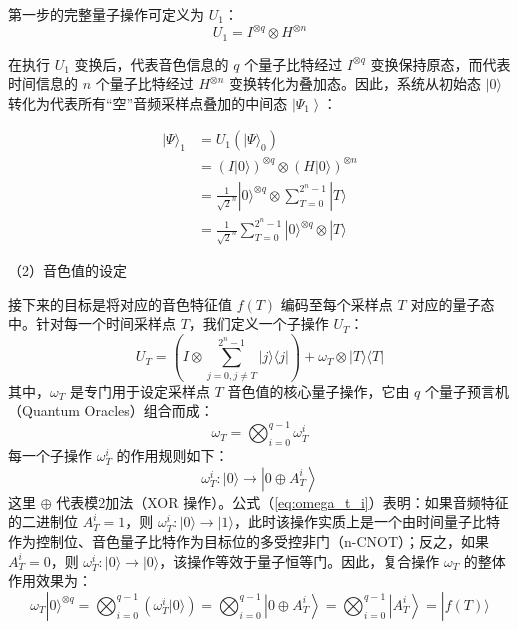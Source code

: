 第一步的完整量子操作可定义为 $U_1$：
\begin{equation}
	U_1=I^{\otimes q} \otimes H^{\otimes n}
	\label{eq:u1_op}
\end{equation}

在执行 $U_1$ 变换后，代表音色信息的 $q$ 个量子比特经过 $I^{\otimes q}$ 变换保持原态，而代表时间信息的 $n$ 个量子比特经过 $H^{\otimes n}$ 变换转化为叠加态。因此，系统从初始态 $|0\rangle$ 转化为代表所有“空”音频采样点叠加的中间态 $\left|\Psi_1\right\rangle$：

\begin{equation}
	\begin{aligned}
		|\Psi\rangle_1 &= U_1\left(|\Psi\rangle_0\right) \\
		&= (I|0\rangle)^{\otimes q} \otimes(H|0\rangle)^{\otimes n} \\
		&= \frac{1}{\sqrt{2}^n}|0\rangle^{\otimes q} \otimes \sum_{T=0}^{2^n-1}|T\rangle \\
		&= \frac{1}{\sqrt{2}^n} \sum_{T=0}^{2^n-1}|0\rangle^{\otimes q} \otimes |T\rangle
	\end{aligned}
	\label{eq:psi_1}
\end{equation}

（2）音色值的设定

接下来的目标是将对应的音色特征值 $f(T)$ 编码至每个采样点 $T$ 对应的量子态中。针对每一个时间采样点 $T$，我们定义一个子操作 $U_T$：
\begin{equation}
	U_T=\left(I \otimes \sum_{j=0, j \neq T}^{2^n-1}|j\rangle\langle j|\right)+\omega_T \otimes|T\rangle\langle T|
	\label{eq:u_t}
\end{equation}
其中，$\omega_T$ 是专门用于设定采样点 $T$ 音色值的核心量子操作，它由 $q$ 个量子预言机（Quantum Oracles）组合而成：
\begin{equation}
	\omega_T=\bigotimes_{i=0}^{q-1} \omega_T^i
	\label{eq:omega_t}
\end{equation}
每一个子操作 $\omega_T^i$ 的作用规则如下：
\begin{equation}
	\omega_T^i:|0\rangle \rightarrow\left|0 \oplus A_T^i\right\rangle
	\label{eq:omega_t_i}
\end{equation}
这里 $\oplus$ 代表模2加法（XOR 操作）。公式（\ref{eq:omega_t_i}）表明：如果音频特征的二进制位 $A_T^i=1$，则 $\omega_T^i:|0\rangle \rightarrow|1\rangle$，此时该操作实质上是一个由时间量子比特作为控制位、音色量子比特作为目标位的多受控非门（n-CNOT）；反之，如果 $A_T^i=0$，则 $\omega_T^i:|0\rangle \rightarrow|0\rangle$，该操作等效于量子恒等门。因此，复合操作 $\omega_T$ 的整体作用效果为：
\begin{equation}
	\omega_T|0\rangle^{\otimes q}=\bigotimes_{i=0}^{q-1}\left(\omega_T^i|0\rangle\right)=\bigotimes_{i=0}^{q-1}\left|0 \oplus A_T^i\right\rangle=\bigotimes_{i=0}^{q-1}\left|A_T^i\right\rangle=|f(T)\rangle
	\label{eq:omega_t_effect}
\end{equation}


